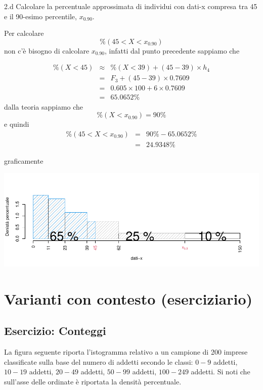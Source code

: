 \documentclass[
  11pt,
]{book}
\theoremstyle{mytheoremstyle}
\theoremstyle{mydefstyle}
\newenvironment{sol}
  {
  \begin{tcolorbox}[enhanced,breakable,arc=0.1mm,boxrule=1pt,colback=white,colframe=iblue,
  title=\bf \fontfamily{lmss}\selectfont \hspace{.5 cm} Soluzione,drop fuzzy shadow]

}{
\end{tcolorbox}
  }
\begin{document}
2.d Calcolare la percentuale approssimata di individui con dati-x compresa tra 45 e il 90-esimo percentile, \(x_{0.90}\).

\begin{sol}

Per calcolare
\[
\%(45< X < x_{0.90})
\]
non c'è bisogno di calcolare \(x_{0.90}\), infatti dal punto precedente sappiamo che

\begin{eqnarray*}
\%(X<45)   &\approx&  \%(X<39)+(45-39)\times h_4\\
&=& F_3+(45-39)\times 0.7609\\
&=& 0.605\times 100 + 6\times 0.7609\\
&=& 65.0652\%
\end{eqnarray*}
dalla teoria sappiamo che
\[
\%(X<x_{0.90})=90\%
\]
e quindi
\begin{eqnarray*}
\%(45< X < x_{0.90}) &=& 90\%-65.0652\%\\
                     &=& 24.9348\%
\end{eqnarray*}

graficamente

\begin{center}\includegraphics{Esami_passati_con_soluzioni_files/figure-latex/01-descr-13-1} \end{center}

\end{sol}

\section{Varianti con contesto (eserciziario)}\label{varianti-con-contesto-eserciziario}

\subsection{Esercizio: Conteggi}\label{esercizio-conteggi}

La figura seguente riporta l'istogramma relativo a un campione
di 200 imprese classificate sulla base del numero di addetti
secondo le classi: \(0-9\) addetti, \(10-19\) addetti, \(20-49\) addetti,
\(50-99\) addetti, \(100-249\) addetti.
Si noti che sull'asse delle ordinate è riportata la densità
percentuale.
\end{document}
